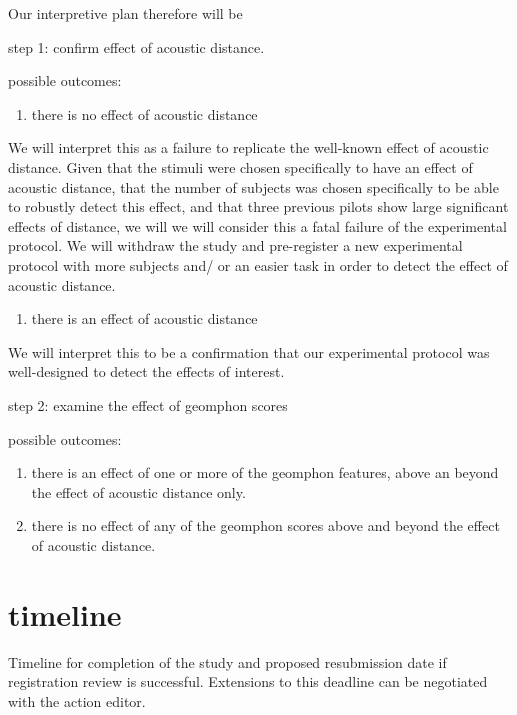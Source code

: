 \documentclass[]{article}
\providecommand{\tightlist}{%
  \setlength{\itemsep}{0pt}\setlength{\parskip}{0pt}}
\begin{document}
Our interpretive plan therefore will be

step 1: confirm effect of acoustic distance.

possible outcomes:

\begin{enumerate}
\def\labelenumi{\alph{enumi})}
\tightlist
\item
  there is no effect of acoustic distance
\end{enumerate}

We will interpret this as a failure to replicate the well-known effect
of acoustic distance. Given that the stimuli were chosen specifically to
have an effect of acoustic distance, that the number of subjects was
chosen specifically to be able to robustly detect this effect, and that
three previous pilots show large significant effects of distance, we
will we will consider this a fatal failure of the experimental protocol.
We will withdraw the study and pre-register a new experimental protocol
with more subjects and/ or an easier task in order to detect the effect
of acoustic distance.

\begin{enumerate}
\def\labelenumi{\alph{enumi})}
\setcounter{enumi}{1}
\tightlist
\item
  there is an effect of acoustic distance
\end{enumerate}

We will interpret this to be a confirmation that our experimental
protocol was well-designed to detect the effects of interest.

step 2: examine the effect of geomphon scores

possible outcomes:

\begin{enumerate}
\def\labelenumi{\alph{enumi})}
\item
  there is an effect of one or more of the geomphon features, above an
  beyond the effect of acoustic distance only.
\item
  there is no effect of any of the geomphon scores above and beyond the
  effect of acoustic distance.
\end{enumerate}

\hypertarget{timeline}{%
\section{timeline}\label{timeline}}

Timeline for completion of the study and proposed resubmission date if
registration review is successful. Extensions to this deadline can be
negotiated with the action editor.
\end{document}
